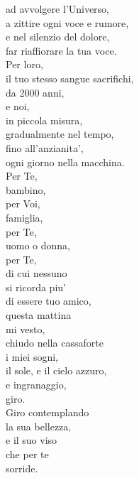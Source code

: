 \begin{haiku}
ad avvolgere l'Universo,\\
a zittire ogni voce e rumore,\\
e nel silenzio del dolore,\\
far riaffiorare la tua voce.\\
Per loro,\\
il tuo stesso sangue sacrifichi, \\
da 2000 anni,\\
e noi,\\
in piccola misura,\\
gradualmente nel tempo,\\
fino all'anzianita',\\
ogni giorno nella macchina.\\
Per Te,\\
bambino,\\
per Voi,\\
famiglia,\\
per Te,\\
uomo o donna,\\
per Te,\\
di cui nessuno\\
si ricorda piu'\\
di essere tuo amico,\\
questa mattina\\
mi vesto,\\
chiudo nella cassaforte\\
i miei sogni,\\
il sole, e il cielo azzuro,\\
e ingranaggio,\\
giro.\\
Giro contemplando\\
la sua bellezza,\\
e il suo viso\\
che per te\\
sorride.\\
\end{haiku}

